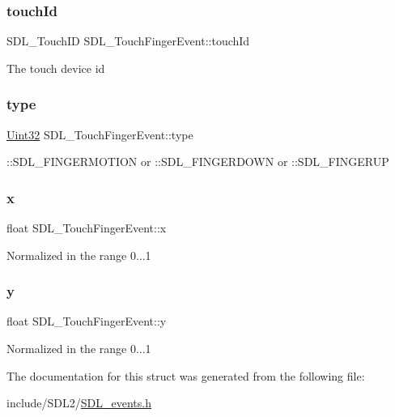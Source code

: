 \subsubsection{\texorpdfstring{touch\+Id}{touchId}}
{\footnotesize\ttfamily S\+D\+L\+\_\+\+Touch\+ID S\+D\+L\+\_\+\+Touch\+Finger\+Event\+::touch\+Id}

The touch device id \mbox{\label{struct_s_d_l___touch_finger_event_a3883218fa3426065ca66086c100edbfa}} 
\subsubsection{\texorpdfstring{type}{type}}
{\footnotesize\ttfamily \hyperlink{_s_d_l__stdinc_8h_add440eff171ea5f55cb00c4a9ab8672d}{Uint32} S\+D\+L\+\_\+\+Touch\+Finger\+Event\+::type}

\+::\+S\+D\+L\+\_\+\+F\+I\+N\+G\+E\+R\+M\+O\+T\+I\+ON or \+::\+S\+D\+L\+\_\+\+F\+I\+N\+G\+E\+R\+D\+O\+WN or \+::\+S\+D\+L\+\_\+\+F\+I\+N\+G\+E\+R\+UP \mbox{\label{struct_s_d_l___touch_finger_event_a0ce44b1342220fa17e9b9b4a77c2c906}} 
\subsubsection{\texorpdfstring{x}{x}}
{\footnotesize\ttfamily float S\+D\+L\+\_\+\+Touch\+Finger\+Event\+::x}

Normalized in the range 0...1 \mbox{\label{struct_s_d_l___touch_finger_event_ac2bb8af638d2927a8e13f6ffe8f9384e}} 
\subsubsection{\texorpdfstring{y}{y}}
{\footnotesize\ttfamily float S\+D\+L\+\_\+\+Touch\+Finger\+Event\+::y}

Normalized in the range 0...1 

The documentation for this struct was generated from the following file\+:\begin{DoxyCompactItemize}
\item 
include/\+S\+D\+L2/\hyperlink{_s_d_l__events_8h}{S\+D\+L\+\_\+events.\+h}\end{DoxyCompactItemize}
